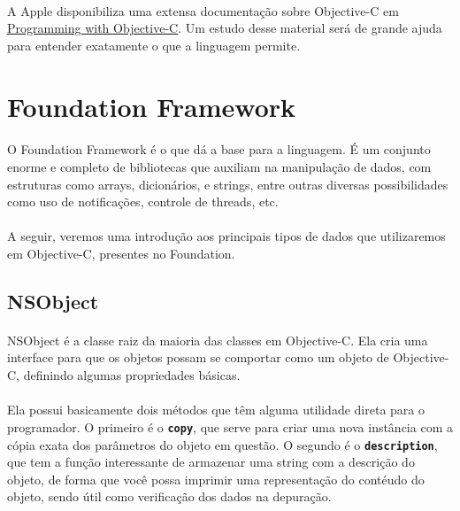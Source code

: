 \documentclass[a4paper,12pt,brazil,doubleside]{book}
\begin{document}
\paragraph{}A Apple disponibiliza uma extensa documentação sobre Objective-C em \href{https://developer.apple.com/library/ios/#documentation/Cocoa/Conceptual/ProgrammingWithObjectiveC/Introduction/Introduction.html}{Programming with Objective-C}. Um estudo desse material será de grande ajuda para entender exatamente o que a linguagem permite.

\bigskip
\bigskip


\section{Foundation Framework}

\paragraph{}O Foundation Framework é o que dá a base para a linguagem. É um conjunto enorme e completo de bibliotecas que auxiliam na manipulação de dados, com estruturas como arrays, dicionários, e strings, entre outras diversas possibilidades como uso de notificações, controle de threads, etc.
\paragraph{}A seguir, veremos uma introdução aos principais tipos de dados que utilizaremos em Objective-C, presentes no Foundation.

\bigskip

\subsection{NSObject}

\paragraph{}NSObject é a classe raiz da maioria das classes em Objective-C. Ela cria uma interface para que os objetos possam se comportar como um objeto de Objective-C, definindo algumas propriedades básicas.
\paragraph{}Ela possui basicamente dois métodos que têm alguma utilidade direta para o programador. O primeiro é o \texttt{\textbf{copy}}, que serve para criar uma nova instância com a cópia exata dos parâmetros do objeto em questão. O segundo é o \texttt{\textbf{description}}, que tem a função interessante de armazenar uma string com a descrição do objeto, de forma que você possa imprimir uma representação do contéudo do objeto, sendo útil como verificação dos dados na depuração.
\end{document}
